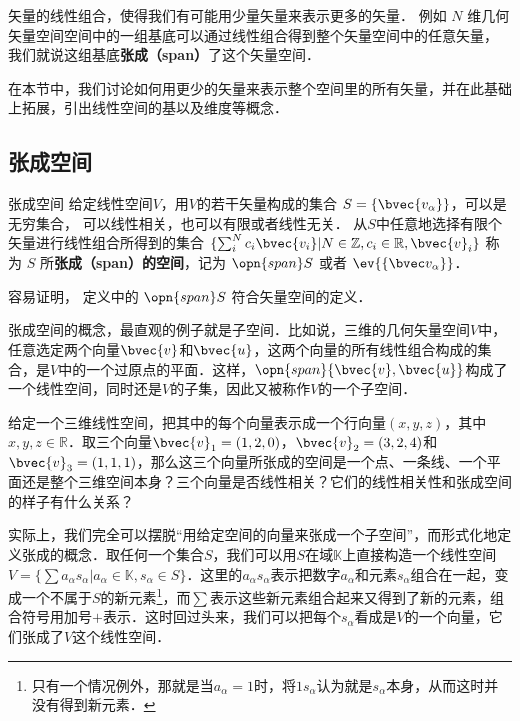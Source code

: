 
\begin{issues}
\issueTODO
\end{issues}


矢量的线性组合，使得我们有可能用少量矢量来表示更多的矢量． 例如 $N$ 维几何矢量空间空间中的一组基底可以通过线性组合得到整个矢量空间中的任意矢量， 我们就说这组基底\textbf{张成（span）}了这个矢量空间． 

在本节中，我们讨论如何用更少的矢量来表示整个空间里的所有矢量，并在此基础上拓展，引出线性空间的基以及维度等概念．

\subsection{张成空间}

\begin{definition}{张成空间}
给定线性空间$V$，用$V$的若干矢量构成的集合 $S=\{\bvec{v_\alpha}\}$，可以是无穷集合， 可以线性相关，也可以有限或者线性无关． 从$S$中任意地选择有限个矢量进行线性组合所得到的集合 $\{\sum_i^N c_i\bvec{v_i}|N\in\mathbb{Z}, c_i\in\mathbb{R}, \bvec{v}_i\}$ 称为 $S$ 所\textbf{张成（span）的空间}，记为 $\opn{span} S$ 或者 $\ev{\{\bvec v_\alpha\}}$．
\end{definition}
容易证明， 定义中的 $\opn{span} S$ 符合矢量空间的定义．

张成空间的概念，最直观的例子就是子空间．比如说，三维的几何矢量空间$V$中，任意选定两个向量$\bvec{v}$和$\bvec{u}$，这两个向量的所有线性组合构成的集合，是$V$中的一个过原点的平面．这样，$\opn{span}\{\bvec{v}, \bvec{u}\}$构成了一个线性空间，同时还是$V$的子集，因此又被称作$V$的一个子空间．

\begin{exercise}{}\label{VecSpn_exe1}
给定一个三维线性空间，把其中的每个向量表示成一个行向量$(x,y,z)$，其中$x,y,z\in\mathbb{R}$．取三个向量$\bvec{v}_1=(1,2,0)$，$\bvec{v}_2=(3,2,4)$和$\bvec{v}_3=(1,1,1)$，那么这三个向量所张成的空间是一个点、一条线、一个平面还是整个三维空间本身？三个向量是否线性相关？它们的线性相关性和张成空间的样子有什么关系？
\end{exercise}

实际上，我们完全可以摆脱“用给定空间的向量来张成一个子空间”，而形式化地定义张成的概念．取任何一个集合$S$，我们可以用$S$在域$\mathbb{K}$上直接构造一个线性空间$V=\{\sum a_\alpha s_\alpha|a_\alpha\in\mathbb{K}, s_\alpha\in S\}$．这里的$a_\alpha s_\alpha$表示把数字$a_\alpha$和元素$s_\alpha$组合在一起，变成一个不属于$S$的新元素\footnote{只有一个情况例外，那就是当$a_\alpha=1$时，将$1s_\alpha$认为就是$s_\alpha$本身，从而这时并没有得到新元素．}，而$\sum$表示这些新元素组合起来又得到了新的元素，组合符号用加号$+$表示．这时回过头来，我们可以把每个$s_\alpha$看成是$V$的一个向量，它们张成了$V$这个线性空间．

